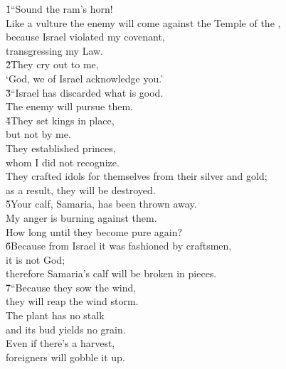 
\begin{poetry}
\poeml {}
\v{1}``Sound the ram's horn! \\
\poeml Like a vulture the enemy will come against the Temple of the , \\
\poeml because Israel violated my covenant, \\
\poemll    transgressing my Law. \\
\poeml \v{2}They cry out to me, \\
\poemll    `God, we of Israel acknowledge you.' \\
\poeml \v{3}``Israel has discarded what is good. \\
\poemll    The enemy will pursue them. \\
\poeml \v{4}They set kings in place, \\
\poemll    but not by me. \\
\poeml They established princes, \\
\poemll    whom I did not recognize. \\
\poeml They crafted idols for themselves from their silver and gold; \\
\poemll    as a result, they will be destroyed. \\
\poeml \v{5}Your calf, Samaria, has been thrown away. \\
\poemll    My anger is burning against them. \\
\poemlll       How long until they become pure again? \\
\poeml \v{6}Because from Israel it was fashioned by craftsmen, \\
\poemll    it is not God; \\
\poemlll       therefore Samaria's calf will be broken in pieces. \\
\poeml \v{7}``Because they sow the wind, \\
\poemll    they will reap the wind storm. \\
\poeml The plant has no stalk \\
\poemll    and its bud yields no grain. \\
\poeml Even if there's a harvest, \\
\poemll    foreigners will gobble it up. \\

\end{poetry}
